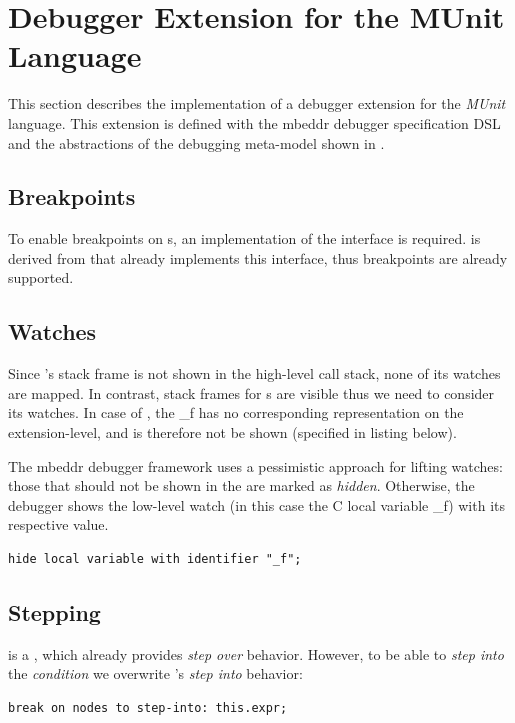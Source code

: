 \section{Debugger Extension for the MUnit Language}

This section describes the implementation of a debugger extension
for the \emph{MUnit} language. This extension is defined with the mbeddr
debugger specification \ac{DSL} and the abstractions of the debugging
meta-model shown in .

\subsection{Breakpoints}  To enable
breakpoints on s, 
an implementation of the  interface is required.
 is derived from  that already implements
this interface, thus breakpoints are already supported.

\subsection{Watches} 

Since 's  stack frame is not shown in the high-level
call stack, none of its watches are mapped.
In contrast,  stack frames for s are visible thus we need
to consider its watches. In case of , the 
 \_f has no corresponding
representation on the extension-level, and is therefore not be shown
(specified in listing below).

The mbeddr debugger framework uses a pessimistic approach for lifting watches:
those that should not be shown in the  are marked as \emph{hidden}.
Otherwise, the debugger shows the low-level watch (in this case the C local
variable \_f) with its respective value.

\begin{lstlisting}[frame=single,language=debuggerDSL]
hide local variable with identifier "_f";
\end{lstlisting}

\subsection{Stepping} 

 is a , which
already provides \emph{step over} behavior. However, to be able to 
\emph{step into} the \emph{condition} we overwrite 's 
\emph{step into} behavior: 
\begin{lstlisting}[language=debuggerDSL,frame=single]
break on nodes to step-into: this.expr;
\end{lstlisting}

